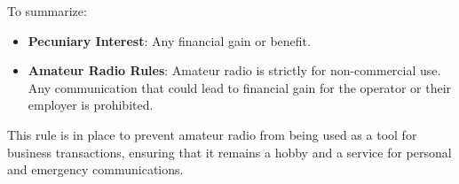 To summarize:
\begin{itemize}
    \item \textbf{Pecuniary Interest}: Any financial gain or benefit.
    \item \textbf{Amateur Radio Rules}: Amateur radio is strictly for non-commercial use. Any communication that could lead to financial gain for the operator or their employer is prohibited.
\end{itemize}

This rule is in place to prevent amateur radio from being used as a tool for business transactions, ensuring that it remains a hobby and a service for personal and emergency communications.

